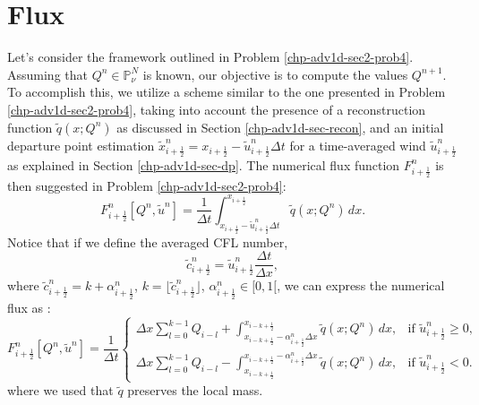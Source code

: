 \section{Flux}
\label{chp-adv1d-sec-flux}
Let's consider the framework outlined in Problem \ref{chp-adv1d-sec2-prob4}.
Assuming that $Q^{n} \in \mathbb{P}^{N}_{\nu}$ is known, our objective is to compute the values $Q^{n+1}$.
To accomplish this, we utilize a scheme similar to the one presented in Problem \ref{chp-adv1d-sec2-prob4},
taking into account the presence of a reconstruction function $\tilde{q}(x;Q^n)$ as discussed in Section
\ref{chp-adv1d-sec-recon}, and an initial departure point estimation
$\tilde{x}_{i+\frac{1}{2}}^n = {x}_{i+\frac{1}{2}} -\tilde{u}_{i+\frac{1}{2}}^n \Delta t$
for a time-averaged wind $\tilde{u}_{i+\frac{1}{2}}^n$ as explained in Section \ref{chp-adv1d-sec-dp}.
The numerical flux function ${F}^{n}_{i+\frac{1}{2}}$ is then suggested in Problem \ref{chp-adv1d-sec2-prob4}:
\begin{equation}
	\label{chp-sec-flux:numerical-flux1}
	{F}^{n}_{i+\frac{1}{2}}[Q^n,\tilde{u}^n]  = \frac{1}{\Delta t}
	\int_{x_{i+\frac{1}{2}}-\tilde{u}^n_{i+\frac{1}{2}}\Delta t}^{x_{i+\frac{1}{2}}}
	\tilde{q}(x;Q^n) \,dx.
\end{equation}
Notice that if we define the averaged CFL number,
\begin{equation*}
	\label{chp-sec-flux:cedges}
	\tilde{c}_{i+\frac{1}{2}}^n = \tilde{u}_{i+\frac{1}{2}}^n\frac{\Delta t}{\Delta x},
\end{equation*}
where $\tilde{c}_{i+\frac{1}{2}}^n = k + \alpha_{i+\frac{1}{2}}^n$, $k = \lfloor \tilde{c}_{i+\frac{1}{2}}^n \rfloor$,
$\alpha_{i+\frac{1}{2}}^n \in [0,1[$,
we can express the numerical flux as \citep{lin:1996, chen:2017}:
\begin{equation}
	\label{chp-sec-flux:numerical-flux}
	{F}_{i+\frac{1}{2}}^n[Q^n,\tilde{u}^n] =  \frac{1}{\Delta t}
	\begin{cases}
	\Delta x\sum_{l=0}^{k-1} Q_{i-l} +  
    \int_{x_{i-k+\frac{1}{2}}-{\alpha}^n_{i+\frac{1}{2}}\Delta x}^{x_{i-k+\frac{1}{2}}}
    \tilde{q}(x;Q^n) \,dx, & \text{if } \tilde{u}_{i+\frac{1}{2}}^n \geq 0,\\
	\Delta x\sum_{l=0}^{k-1} Q_{i-l} -  
    \int^{x_{i-k+\frac{1}{2}}-{\alpha}^n_{i+\frac{1}{2}}\Delta x}_{x_{i-k+\frac{1}{2}}}
    \tilde{q}(x;Q^n) \,dx, & \text{if } \tilde{u}_{i+\frac{1}{2}}^n < 0.
	\end{cases}
\end{equation}
where we used that $\tilde{q}$ preserves the local mass.

